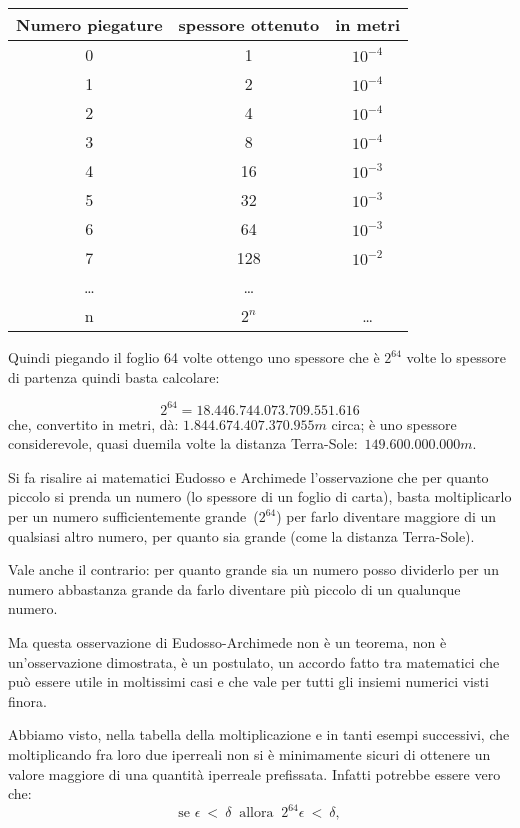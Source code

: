 \begin{center}
 \begin{tabular}{ccc}
\toprule
Numero piegature & spessore ottenuto & in metri\\
\midrule
0 & 1 & $10^{-4}$\\
1 & 2 & $10^{-4}$\\
2 & 4 & $10^{-4}$\\
3 & 8 & $10^{-4}$\\
4 & 16 & $10^{-3}$\\
5 & 32 & $10^{-3}$\\
6 & 64 & $10^{-3}$\\
7 & 128 & $10^{-2}$\\
\ldots& \ldots\\
n & $2^n$ & \ldots\\
\bottomrule
\end{tabular}
\end{center}

Quindi piegando il foglio 64 volte ottengo uno spessore che è $2^{64}$ volte lo 
spessore di partenza quindi basta calcolare:

\[2^{64} = 18.446.744.073.709.551.616\]
che, convertito in metri, dà: $1.844.674.407.370.955m$ circa; è uno spessore 
considerevole, quasi duemila volte la distanza Terra-Sole:~$149.600.000.000m$.

Si fa risalire ai matematici Eudosso e Archimede l'osservazione che per quanto 
piccolo si prenda un numero (lo spessore di un foglio di carta), basta 
moltiplicarlo per un numero sufficientemente grande~($2^{64}$) per farlo 
diventare maggiore di un qualsiasi altro numero, per quanto sia grande 
(come la distanza Terra-Sole).

Vale anche il contrario: per quanto grande sia un numero posso dividerlo per un 
numero abbastanza grande da farlo diventare più piccolo di un qualunque numero.

Ma questa osservazione di Eudosso-Archimede non è un teorema, non è 
un'osservazione dimostrata, è un postulato, un accordo fatto tra matematici che 
può essere utile in moltissimi casi e che vale per tutti gli insiemi numerici 
visti finora. 

Abbiamo visto, nella tabella della moltiplicazione e in tanti esempi successivi, che 
moltiplicando fra loro due iperreali non si è minimamente sicuri di ottenere un
valore maggiore di una quantità iperreale prefissata. Infatti potrebbe essere vero che:
\[
 \text{se }\epsilon \  < \ \delta\ \text{  allora  }\ 2^{64}\epsilon\ <\ \delta,
\]

